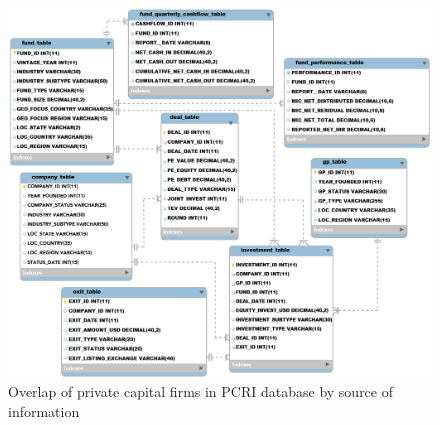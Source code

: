 
\begin{figure}[tb]
    \centering
\includegraphics[width=\widthpcrib]{"./assets/pcri/pcrifigure2.png"}
\caption{Overlap of private capital firms in PCRI database by source of information\label{fig:pcrifigure2}}
\end{figure}